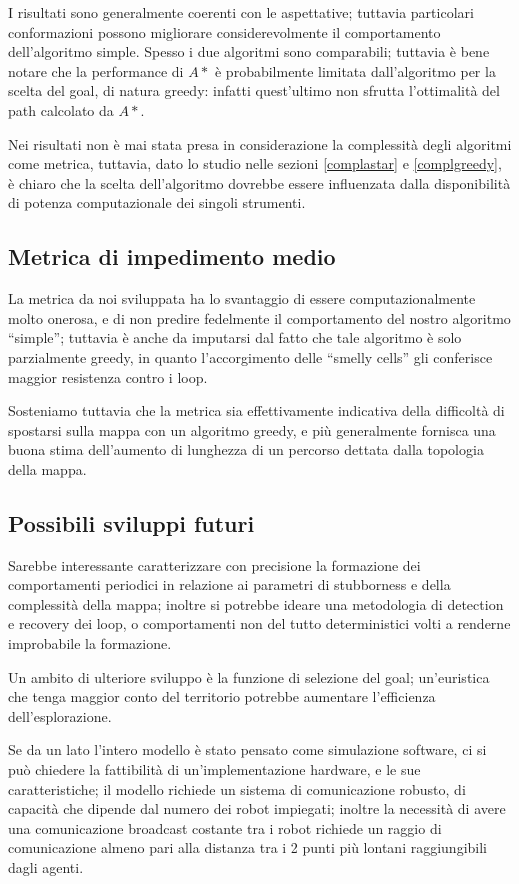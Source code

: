 I risultati sono generalmente coerenti con le aspettative; tuttavia particolari
conformazioni possono migliorare considerevolmente il comportamento
dell'algoritmo simple. Spesso i due algoritmi sono comparabili; tuttavia è bene
notare che la performance di $A*$ è probabilmente limitata dall'algoritmo per la 
scelta del goal, di natura greedy: infatti quest'ultimo non sfrutta
l'ottimalità del path calcolato da $A*$.

Nei risultati non è mai stata presa in considerazione la complessità degli
algoritmi come metrica, tuttavia, dato lo studio nelle sezioni \ref {complastar}
e \ref{complgreedy}, è chiaro che la scelta dell'algoritmo dovrebbe essere
influenzata dalla disponibilità di potenza computazionale dei singoli strumenti.

\subsection{Metrica di impedimento medio}
La metrica da noi sviluppata ha lo svantaggio di essere computazionalmente molto
onerosa, e di non predire fedelmente il comportamento del nostro algoritmo ``simple'';
tuttavia è anche da imputarsi dal fatto che tale algoritmo è solo parzialmente greedy,
in quanto l'accorgimento delle ``smelly cells'' gli conferisce maggior resistenza
contro i loop.

Sosteniamo tuttavia che la metrica sia effettivamente indicativa della difficoltà
di spostarsi sulla mappa con un algoritmo greedy, e più generalmente fornisca
una buona stima dell'aumento di lunghezza di un percorso dettata dalla topologia
della mappa.
\subsection{Possibili sviluppi futuri}
Sarebbe interessante caratterizzare con precisione la formazione dei
comportamenti periodici in relazione ai parametri di stubborness e della
complessità della mappa; inoltre si potrebbe ideare una metodologia di detection
e recovery dei loop, o comportamenti non del tutto deterministici volti a
renderne improbabile la formazione.

Un ambito di ulteriore sviluppo è la funzione di selezione del goal; un'euristica
che tenga maggior conto del territorio potrebbe aumentare l'efficienza
dell'esplorazione.

Se da un lato l'intero modello è stato pensato come simulazione software, ci si
può chiedere la fattibilità di un'implementazione hardware, e le sue caratteristiche;
il modello richiede un sistema di comunicazione robusto, di capacità che dipende
dal numero dei robot impiegati; inoltre la necessità di avere una comunicazione
broadcast costante tra i robot richiede un raggio di comunicazione almeno pari alla
distanza tra i 2 punti più lontani raggiungibili dagli agenti.